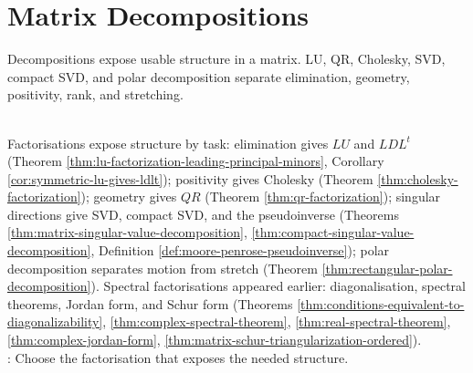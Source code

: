 \section{Matrix Decompositions}

%

Decompositions expose usable structure in a matrix. LU, QR, Cholesky, SVD, compact SVD, and polar decomposition separate elimination, geometry, positivity, rank, and stretching.

\begin{perspective} \label{per:matrix-factorization-roadmap} \\
Factorisations expose structure by task: elimination gives $LU$ and $LDL^t$ (Theorem \ref{thm:lu-factorization-leading-principal-minors}, Corollary \ref{cor:symmetric-lu-gives-ldlt}); positivity gives Cholesky (Theorem \ref{thm:cholesky-factorization}); geometry gives $QR$ (Theorem \ref{thm:qr-factorization}); singular directions give SVD, compact SVD, and the pseudoinverse (Theorems \ref{thm:matrix-singular-value-decomposition}, \ref{thm:compact-singular-value-decomposition}, Definition \ref{def:moore-penrose-pseudoinverse}); polar decomposition separates motion from stretch (Theorem \ref{thm:rectangular-polar-decomposition}). Spectral factorisations appeared earlier: diagonalisation, spectral theorems, Jordan form, and Schur form (Theorems \ref{thm:conditions-equivalent-to-diagonalizability}, \ref{thm:complex-spectral-theorem}, \ref{thm:real-spectral-theorem}, \ref{thm:complex-jordan-form}, \ref{thm:matrix-schur-triangularization-ordered}).\\
: Choose the factorisation that exposes the needed structure.
\end{perspective}



